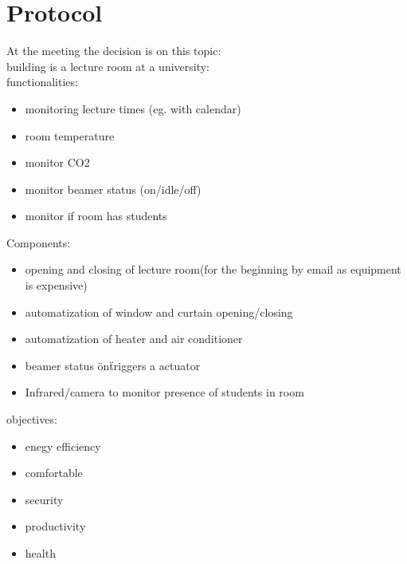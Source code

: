 \documentclass[DIN, pagenumber=false, fontsize=11pt, parskip=half]{scrartcl}
\begin{document}
\section{Protocol}
At the meeting the decision is on this topic:\\

building is a lecture room  at a university:\\

functionalities:\\
\begin{itemize}
\item monitoring lecture times (eg. with calendar)
\item room temperature 
\item monitor CO2
\item monitor beamer status (on/idle/off)
\item monitor if room has students
\end{itemize}

Components:\\
\begin{itemize}
\item opening and closing of lecture room(for the beginning by email as equipment is expensive)
\item automatization of window and curtain opening/closing 
\item automatization of heater and air conditioner
\item beamer status \"on\" triggers a actuator
\item Infrared/camera to monitor presence of students in room
\end{itemize}

objectives:\\
\begin{itemize}
\item enegy efficiency
\item comfortable
\item security
\item productivity
\item health
\end{itemize}
\end{document}
